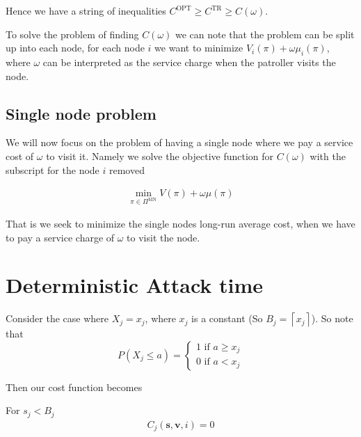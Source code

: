 \documentclass[a4paper,10pt]{article}
\newcommand{\ceil}[1]{\left \lceil #1 \right \rceil}
\theoremstyle{definition}
\theoremstyle{definition}
\theoremstyle{remark}
\theoremstyle{definition}
\begin{document}
Hence we have a string of inequalities $C^{\text{OPT}} \geq C^{\text{TR}} \geq C(\omega)$.

To solve the problem of finding $C(\omega)$ we can note that the problem can be split up into each node, for each node $i$ we want to minimize $V_{i}(\pi)+\omega \mu_{i}(\pi)$, where $\omega$ can be interpreted as the service charge when the patroller visits the node.

\subsection{Single node problem}
We will now focus on the problem of having a single node where we pay a service cost of $\omega$ to visit it. Namely we solve the objective function for $C(\omega)$ with the subscript for the node $i$ removed

\begin{align*}
\min_{\pi \in \Pi^{\text{MN}}} V(\pi) + \omega \mu(\pi)
\end{align*}


That is we seek to minimize the single nodes long-run average cost, when we have to pay a service charge of $\omega$ to visit the node.

\section{Deterministic Attack time}
Consider the case where $X_{j}=x_{j}$, where $x_{j}$ is a constant (So $B_{j}=\ceil{x_{j}}$). So note that 
$$P(X_{j} \leq a)=\begin{cases}
1 \text{ if } a \geq x_{j} \\
0 \text{ if } a < x_{j}
\end{cases}$$

Then our cost function becomes

For $s_{j} < B_{j}$
\begin{align*}
C_{j}(\bm{s},\bm{v},i)=0
\end{align*}
\end{document}
